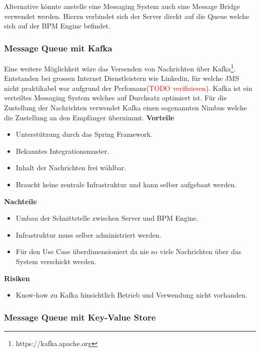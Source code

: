 Alternative könnte anstelle eine Messaging System auch eine Message Bridge verwendet werden. Hierzu verbindet sich der Server direkt auf die Queue welche sich auf der BPM Engine befindet.

\subsubsection{Message Queue mit Kafka}

Eine weitere Möglichkeit wäre das Versenden von Nachrichten über Kafka\footnote{https://kafka.apache.org}. Entstanden bei grossen Internet Dienstleistern wie Linkedin, für welche JMS nicht praktikabel war aufgrund der Perfomanz(\textcolor{red}{TODO verifizieren}). Kafka ist ein verteiltes Messaging System welches auf Durchsatz optimiert ist. Für die Zustellung der Nachrichten verwendet Kafka einen sogenannten Nimbus welche die Zustellung an den Empfänger übernimmt.
\newline
\newline
\textbf{Vorteile}
\begin{itemize}
	\item Unterstützung durch das Spring Framework.
	\item Bekanntes Integrationsmuster.
	\item Inhalt der Nachrichten frei wählbar.
	\item Braucht keine zentrale Infrastruktur und kann selber aufgebaut werden.
\end{itemize}
\textbf{Nachteile}
\begin{itemize}
	\item Umbau der Schnittstelle zwischen Server und BPM Engine.
	\item Infrastruktur muss selber administriert werden.
	\item Für den Use Case überdimensioniert da nie so viele Nachrichten über das System verschickt werden.
\end{itemize}
\textbf{Risiken}
\begin{itemize}
	\item Know-how zu Kafka hinsichtlich Betrieb und Verwendung nicht vorhanden.
\end{itemize}

\subsubsection{Message Queue mit Key-Value Store}

